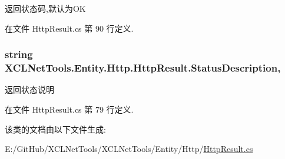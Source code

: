 返回状态码,默认为\+OK 



在文件 Http\+Result.\+cs 第 90 行定义.

\subsubsection[{\texorpdfstring{Status\+Description}{StatusDescription}}]{\setlength{\rightskip}{0pt plus 5cm}string X\+C\+L\+Net\+Tools.\+Entity.\+Http.\+Http\+Result.\+Status\+Description\hspace{0.3cm}{\ttfamily [get]}, {\ttfamily [set]}}\hypertarget{class_x_c_l_net_tools_1_1_entity_1_1_http_1_1_http_result_ae52de9f66b0248b366ee38cc9eae5659}{}\label{class_x_c_l_net_tools_1_1_entity_1_1_http_1_1_http_result_ae52de9f66b0248b366ee38cc9eae5659}


返回状态说明 



在文件 Http\+Result.\+cs 第 79 行定义.



该类的文档由以下文件生成\+:\begin{DoxyCompactItemize}
\item 
E\+:/\+Git\+Hub/\+X\+C\+L\+Net\+Tools/\+X\+C\+L\+Net\+Tools/\+Entity/\+Http/\hyperlink{_http_result_8cs}{Http\+Result.\+cs}\end{DoxyCompactItemize}
